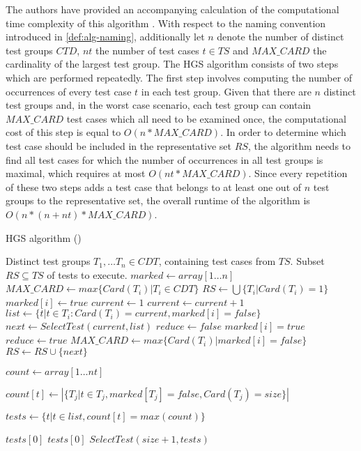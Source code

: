 \noindent The authors have provided an accompanying calculation of the computational time complexity of this algorithm \cite{hgs}. With respect to the naming convention introduced in \autoref{def:alg-naming}, additionally let $n$ denote the number of distinct test groups $CTD$, $nt$ the number of test cases $t \in TS$ and $MAX\_CARD$ the cardinality of the largest test group. The HGS algorithm consists of two steps which are performed repeatedly. The first step involves computing the number of occurrences of every test case $t$ in each test group. Given that there are $n$ distinct test groups and, in the worst case scenario, each test group can contain $MAX\_CARD$ test cases which all need to be examined once, the computational cost of this step is equal to $O(n * MAX\_CARD)$. In order to determine which test case should be included in the representative set $RS$, the algorithm needs to find all test cases for which the number of occurrences in all test groups is maximal, which requires at most $O(nt * MAX\_CARD)$. Since every repetition of these two steps adds a test case that belongs to at least one out of $n$ test groups to the representative set, the overall runtime of the algorithm is $O(n * (n + nt) * MAX\_CARD)$.
\begin{algorithm}[h!]
\caption{HGS algorithm (\cite{hgs})}
\label{alg:hgs}
\begin{algorithmic}[1]
	 Distinct test groups $T_1, \dots T_n \in CDT$, containing test cases from $TS$.
	 Subset $RS \subseteq TS$ of tests to execute.
	\State $marked \gets array[1 \dots n]$ 
	\State $MAX\_CARD \gets max \{Card(T_i) \vert T_i \in CDT\}$
	\State $RS \gets \bigcup \{ T_i \vert Card(T_i) = 1 \}$
		 $marked[i] \gets true$ \EndIf
	\EndFor
	\State $current \gets 1$
		\State $current \gets current + 1$
			\State $list \gets \{t \vert t \in T_i : Card(T_i) = current, marked[i] = false\}$
			\State $next \gets SelectTest(current, list)$
			\State $reduce \gets false$
					\State $marked[i] = true$
					 $reduce \gets true$ \EndIf
				\EndIf
			\EndFor
				\State $MAX\_CARD \gets max \{Card(T_i) \vert marked[i] = false\}$
			\EndIf
			\State $RS \gets RS \cup \{next\}$
		\EndWhile
	\EndWhile
	
		\State $count\gets array[1 \dots nt]$
		
			\State $count[t] \gets |\{T_j \vert t \in T_j, marked[T_j] = false, Card(T_j) = size\}|$
		\EndFor
		
		\State $tests \gets \{t \vert t \in list, count[t] = max(count) \}$
		
		 \Return $tests[0]$
		 \Return $tests[0]$
		\Else{} \Return $SelectTest(size+1, tests)$
		\EndIf
	\EndFunction
\end{algorithmic}
\end{algorithm}